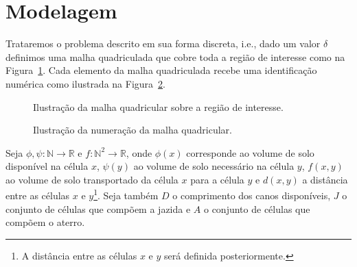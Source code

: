 \section{Modelagem}
Trataremos o problema descrito em sua forma discreta, i.e., dado um valor $\delta$ definimos uma malha quadriculada que cobre toda a regi\~{a}o de interesse como na Figura~\ref{fig:malha_quad}. Cada elemento da malha quadriculada recebe uma identificação numérica como ilustrada na Figura~\ref{fig:malha_quad_num}.
\begin{figure}[!htb]
    \centering
    \caption{Ilustra\c{c}\~{a}o da malha quadricular sobre a regi\~{a}o de interesse.}
    \label{fig:malha_quad}
\end{figure}
\begin{figure}[!htb]
    \centering
    \caption{Ilustra\c{c}\~{a}o da numeração da malha quadricular.}
    \label{fig:malha_quad_num}
\end{figure}

Seja $\phi, \psi: \mathbb{N} \to \mathbb{R}$ e $f: \mathbb{N}^2 \to \mathbb{R}$, onde $\phi(x)$ corresponde ao volume de solo disponível na célula $x$, $\psi(y)$ ao volume de solo necessário na célula $y$, $f(x,y)$ ao volume de solo transportado da célula $x$ para a célula $y$ e $d(x, y)$ a distância entre as células $x$ e $y$\footnote{A distância entre as células $x$ e $y$ será definida posteriormente.}. Seja também $D$ o comprimento dos canos disponíveis, $J$ o conjunto de células que compõem a jazida e $A$ o conjunto de células que compõem o aterro.

